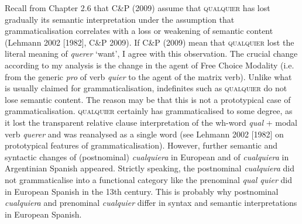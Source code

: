 \begin{styleStandard}
Recall from Chapter 2.6 that C\&P (2009) assume that \textsc{qualquier} has lost gradually its semantic interpretation under the assumption that grammaticalisation correlates with a loss or weakening of semantic content (Lehmann 2002 [1982], C\&P 2009). If C\&P (2009) mean that \textsc{qualquier} lost the literal meaning of \textit{querer} ‘want’, I agree with this observation. The crucial change according to my analysis is the change in the agent of Free Choice Modality (i.e. from the generic \textit{pro} of verb \textit{quier} to the agent of the matrix verb). Unlike what is usually claimed for grammaticalisation, indefinites such as \textsc{qualquier} do not lose semantic content. The reason may be that this is not a prototypical case of grammaticalisation. \textsc{qualquier} certainly has grammaticalised to some degree, as it lost the transparent relative clause interpretation of the wh-word \textit{qual} + modal verb \textit{querer }and was reanalysed as a single word (see Lehmann 2002 [1982] on prototypical features of grammaticalisation). However, further semantic and syntactic changes of (postnominal) \textit{cualquiera} in European and of \textit{cualquiera} in Argentinian Spanish appeared. Strictly speaking, the postnominal \textit{cualquiera} did not grammaticalise into a functional category like the prenominal \textit{qual quier }did in European Spanish in the 13th century. This is probably why postnominal \textit{cualquiera} and prenominal \textit{cualquier} differ in syntax and semantic interpretations in European Spanish. 
\end{styleStandard}

